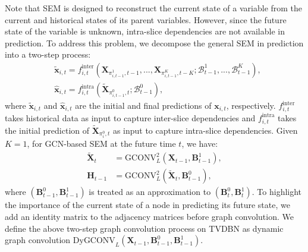 \documentclass[letterpaper, 10 pt, conference]{ieeeconf}
\begin{document}
Note that SEM is designed to reconstruct the current state of a variable from the current and historical states of its parent variables. However, since the future state of the variable is unknown, intra-slice dependencies are not available in prediction. To address this problem, we decompose the general SEM in prediction into a two-step process:
\begin{equation}
        \begin{aligned}
                &\tilde{\mathbf{x}}_{i,t}=f_{i,t}^{\text{inter}}(\mathbf{X}_{\pi_{i,t-1}^1,t-1},...,\mathbf{X}_{\pi_{i,t-1}^K,t-K};\mathcal{B}_{t-1}^1,...,\mathcal{B}_{t-1}^K),\\
                &\hat{\mathbf{x}}_{i,t}=f_{i,t}^{\text{intra}}(\tilde{\mathbf{X}}_{\pi_{i,t-1}^0, t};\mathcal{B}_{t-1}^0),
        \end{aligned}
\end{equation}
where $\tilde{\mathbf{x}}_{i,t}$ and $\hat{\mathbf{x}}_{i,t}$ are the initial and final predictions of $\mathbf{x}_{i,t}$, respectively. $f_{i,t}^{\text{inter}}$ takes historical data as input to capture inter-slice dependencies and $f_{i,t}^{\text{intra}}$ takes the initial prediction of $\tilde{\mathbf{X}}_{\pi_i^0,t}$ as input to capture intra-slice dependencies. Given $K=1$, for GCN-based SEM at the future time $t$, we have:
\begin{equation}
        \label{eq:two_step_gcon}
        \begin{aligned}
                \tilde{\mathbf{X}}_t&=\text{GCONV}^2_L(\mathbf{X}_{t-1}, \mathbf{B}^1_{t-1}),\\
                \mathbf{H}_{t-1}&=\text{GCONV}^2_L(\tilde{\mathbf{X}}_t, \mathbf{B}^0_{t-1}),
        \end{aligned}
\end{equation}
where $(\mathbf{B}^0_{t-1}, \mathbf{B}^1_{t-1})$ is treated as an approximation to $(\mathbf{B}^0_{t}, \mathbf{B}^1_{t})$. To highlight the importance of the current state of a node in predicting its future state, we add an identity matrix to the adjacency matrices before graph convolution. We define the above two-step graph convolution process on TVDBN as dynamic graph convolution $\text{DyGCONV}_L(\mathbf{X}_{t-1},\mathbf{B}^0_{t-1}, \mathbf{B}^1_{t-1})$.
\end{document}
